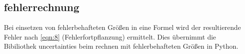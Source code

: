 \subsection{fehlerrechnung}
Bei einsetzen von fehlerbehafteten Größen in eine Formel wird der resultierende Fehler nach 
\autoref{eqn:8} (Fehlerfortpflanzung) ermittelt. Dies übernimmt die Bibiliothek uncertainties
beim rechnen mit fehlerbehafteten Größen in Python.

